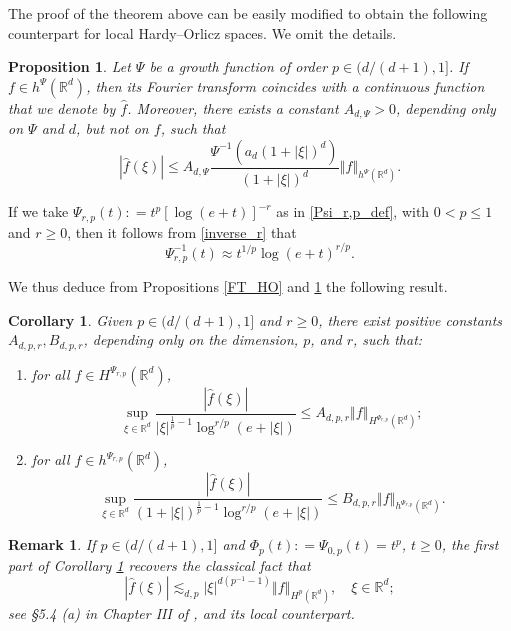 \documentclass[a4paper, leqno, 10pt]{amsart}
\numberwithin{equation}{section}
\newtheorem{corollary}[thm]{Corollary}
\newtheorem{proposition}[thm]{Proposition}
\newtheorem{rmk}[thm]{Remark}
\newcommand{\R}{\mathbb{R}}
\newcommand{\norm}[1]{\left\Vert#1\right\Vert}
\newcommand{\abs}[1]{\left|#1\right|}
\begin{document}
The proof of the theorem above can be easily modified to obtain the following counterpart for local Hardy--Orlicz spaces. We omit the details. 

\begin{proposition}\label{FT_HO_local}
Let $\Psi$ be a growth function of order $p \in (d/(d+1),1]$. If $f\in h^{\Psi} (\R^d)$, then its Fourier transform coincides with a continuous function that we denote by $\widehat{f}$. Moreover, there exists a constant $A_{d, \Psi}> 0$, depending only on $\Psi$ and $d$, but not on $f$, such that
\[
\abs{\widehat{f}(\xi)} \leq A_{d, \Psi}  \frac{ \Psi^{-1} (a_d(1+\abs{ \xi })^d) }{(1+\abs{ \xi })^d} \norm{f}_{h^{\Psi} (\R^d)}.
\]	
\end{proposition}

If we take $\Psi_{r,p} (t) : = t^p \left[ \log (e+t) \right]^{-r}$ as in \eqref{Psi_r,p_def}, 
with $0<p\leq 1$ and $r\geq 0$, then %
it follows from \eqref{inverse_r} that
\begin{equation}\label{eq:approx_inverse}
\Psi^{-1}_{r,p}(t)\approx t^{1/p}\log(e+t)^{r/p}.
\end{equation}

We thus deduce from Propositions \ref{FT_HO} and \ref{FT_HO_local} the following result.
 
\begin{corollary}\label{FT_Llog} Given $p \in (d/(d+1), 1]$ and $r\geq 0$, there exist positive constants $A_{d,p,r}, B_{d,p,r}$, depending only on the dimension, $p$, and $r$, such that:
\begin{enumerate}
\item for all $f \in H^{\Psi_{r,p}} (\R^d)$,
\[
\sup_{\xi \in \R^d} \frac{ \abs{\widehat{f} (\xi)} } {\abs{\xi}^{\frac{1}{p}-1}\log^{r/p} (e+\abs{\xi})} \leq A_{d,p,r}  \norm{f}_{H^{\Psi_{r,p}} (\R^d)};
\]
\item for all $f \in h^{\Psi_{r,p}} (\R^d)$,
\[
\sup_{\xi \in \R^d} \frac{ \abs{\widehat{f} (\xi)} } {(1+\abs{\xi})^{\frac{1}{p}-1}\log^{r/p} (e+\abs{\xi})} \leq B_{d,p,r}  \norm{f}_{h^{\Psi_{r,p}} (\R^d)}.
\]
\end{enumerate} 
\end{corollary}

\begin{rmk}
If $p \in (d/(d+1),1]$ and $\Phi_p (t): =\Psi_{0,p}(t)= t^p $, $t \geq 0$, the first part of Corollary \ref{FT_Llog} recovers the classical fact that
\[
\abs{\widehat{f} (\xi)} \lesssim_{d,p} \abs{\xi}^{d (p^{-1}-1)} \norm{f}_{H^p (\R^d)}, \quad \xi \in \R^d; 
\]
see \S 5.4 (a) in Chapter III  of \cite{Big_Stein}, and its local counterpart. 
\end{rmk}
\end{document}
